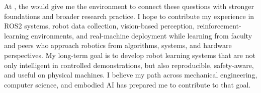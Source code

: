 At \GetUniversityName, the \GetProgramName{} would give me the environment to connect these questions with stronger foundations and broader research practice. I hope to contribute my experience in ROS2 systems, robot data collection, vision-based perception, reinforcement-learning environments, and real-machine deployment while learning from faculty and peers who approach robotics from algorithms, systems, and hardware perspectives. My long-term goal is to develop robot learning systems that are not only intelligent in controlled demonstrations, but also reproducible, safety-aware, and useful on physical machines. I believe my path across mechanical engineering, computer science, and embodied AI has prepared me to contribute to that goal.
